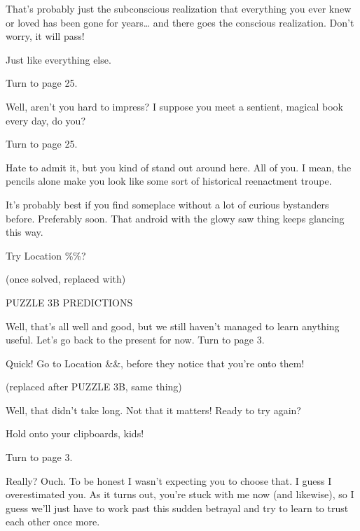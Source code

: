 \documentclass[14pt]{extbook}
\begin{document}
\vspace*{\fill}
That’s probably just the subconscious realization that everything you ever knew or loved has been gone for years… and there goes the conscious realization. Don’t worry, it will pass!

Just like everything else.

Turn to page 25.
\vspace*{\fill}
\newpage

\vspace*{\fill}
Well, aren’t you hard to impress? I suppose you meet a sentient, magical book every day, do you?

Turn to page 25.
\vspace*{\fill}
\newpage

\vspace*{\fill}
Hate to admit it, but you kind of stand out around here. All of you. I mean, the pencils alone make you look like some sort of historical reenactment troupe.

It’s probably best if you find someplace without a lot of curious bystanders before. Preferably soon. That android with the glowy saw thing keeps glancing this way.

Try Location \%\%?

(once solved, replaced with)

PUZZLE 3B
PREDICTIONS

Well, that’s all well and good, but we still haven’t managed to learn anything useful. Let’s go back to the present for now. Turn to page 3.
\vspace*{\fill}
\newpage

\vspace*{\fill}
Quick! Go to Location \&\&, before they notice that you’re onto them!

(replaced after PUZZLE 3B, same thing)
\vspace*{\fill}
\newpage

\vspace*{\fill}
\vspace*{\fill}
\newpage

\vspace*{\fill}
Well, that didn’t take long. Not that it matters! Ready to try again?

Hold onto your clipboards, kids!

Turn to page 3.
\vspace*{\fill}
\newpage

\vspace*{\fill}
Really? Ouch. To be honest I wasn’t expecting you to choose that. I guess I overestimated you. As it turns out, you’re stuck with me now (and likewise), so I guess we’ll just have to work past this sudden betrayal and try to learn to trust each other once more.
\end{document}
